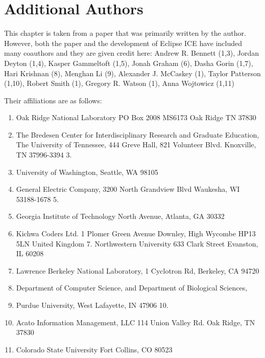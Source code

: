 \section{Additional Authors}

This chapter is taken from a paper that was primarily written by the author.
However, both the paper and the development of Eclipse ICE have included
many coauthors and they are given credit here: Andrew R. Bennett (1,3), Jordan
Deyton (1,4), Kasper Gammeltoft (1,5), Jonah Graham (6), Dasha Gorin (1,7), Hari
Krishnan (8), Menghan Li (9), Alexander J. McCaskey (1), Taylor Patterson
(1,10), Robert Smith (1), Gregory R. Watson (1), Anna Wojtowicz (1,11)

Their affiliations are as follows:
\begin{enumerate}
\item Oak Ridge National Laboratory PO Box 2008 MS6173 Oak Ridge TN 37830
\item The Bredesen Center for Interdisciplinary Research and Graduate Education,
The University of Tennessee, 444 Greve Hall, 821 Volunteer Blvd. Knoxville, TN 37996-3394 3. 
\item University of Washington, Seattle, WA 98105
\item General Electric Company, 3200 North Grandview Blvd Waukesha, WI
 53188-1678 5. 
\item Georgia Institute of Technology North Avenue, Atlanta, GA 30332
\item Kichwa Coders Ltd. 1 Plomer Green Avenue Downley, High Wycombe HP13 5LN
 United Kingdom 7. Northwestern University 633 Clark Street Evanston, IL 60208
\item Lawrence Berkeley National Laboratory, 1 Cyclotron Rd, Berkeley, CA 94720
\item Department of Computer Science, and Department of Biological Sciences,
\item Purdue University, West Lafayette, IN 47906 10. 
\item Acato Information Management, LLC 114 Union Valley Rd. Oak Ridge, TN 37830
\item Colorado State University Fort Collins, CO  80523
\end{enumerate}